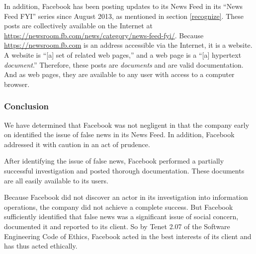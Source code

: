\par In addition, Facebook has been posting updates to its News Feed in its ``News Feed FYI'' series since August 2013, as mentioned in section \ref{recognize}. These posts are collectively available on the Internet at \url{https://newsroom.fb.com/news/category/news-feed-fyi/}. Because \url{https://newsroom.fb.com} is an address accessible via the Internet, it is a website. \cite{oxford} A website is ``[a] set of related web pages,'' \cite{oxford} and a web page is a ``[a] hypertext \emph{document}.'' \cite{oxford} Therefore, these posts are \emph{documents} and are valid documentation. And as web pages, they are available to any user with access to a computer browser.

\subsubsection{Conclusion}

\par We have determined that Facebook was not negligent in that the company early on identified the issue of false news in its News Feed. In addition, Facebook addressed it with caution in an act of prudence.

\par After identifying the issue of false news, Facebook performed a partially successful investigation and posted thorough documentation. These documents are all easily available to its users.

\par Because Facebook did not discover an actor in its investigation into information operations, \cite{fb_info_ops }the company did not achieve a complete success. But Facebook sufficiently identified that false news was a significant issue of social concern, documented it and reported to its client. So by Tenet 2.07 of the Software Engineering Code of Ethics, Facebook acted in the best interests of its client and has thus acted ethically.